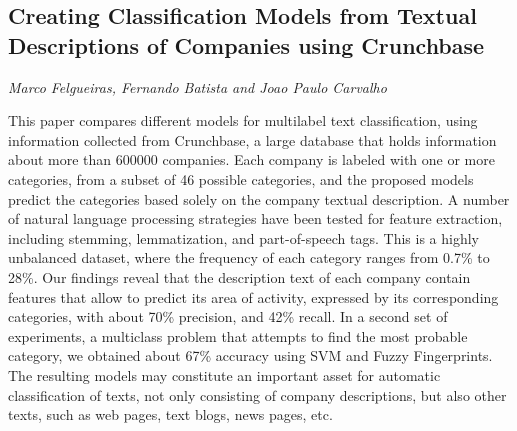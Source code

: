 \documentclass[../booklet.tex]{subfiles}
\begin{document}
\subsection[Creating Classification Models from Textual Descriptions of Companies using Crunchbase. {\it Marco Felgueiras, Fernando Batista and Joao Paulo Carvalho}]{Creating Classification Models from Textual Descriptions of Companies using Crunchbase}
  

\begin{center}
  {\it Marco Felgueiras, Fernando Batista and Joao Paulo Carvalho}
\end{center}



This paper compares different models for multilabel text classification, using information collected from Crunchbase, a large data\-base that holds information about more than 600000 companies. Each company is labeled with one or more categories, from a subset of 46 possible categories, and the proposed models predict the categories based solely on the company textual description. A number of natural language processing strategies have been tested for feature extraction, including stemming, lemmatization, and part-of-speech tags. This is a highly unbalanced dataset, where the frequency of each category ranges from 0.7\% to 28\%. Our findings reveal that the description text of each company contain features that allow to predict its area of activity, expressed by its corresponding categories, with about 70\% precision, and 42\% recall. In a second set of experiments, a multiclass problem that attempts to find the most probable category, we obtained about 67\% accuracy using SVM and Fuzzy Fingerprints. The resulting models may constitute an important asset for automatic classification of texts, not only consisting of company descriptions, but also other texts, such as web pages, text blogs, news pages, etc.

\end{document}
